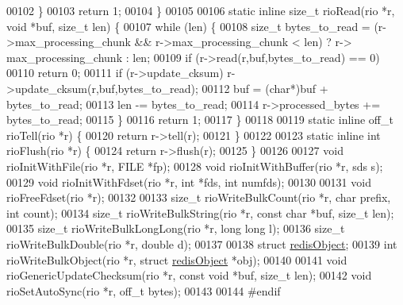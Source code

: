 \begin{DoxyCode}
00102     \}
00103     \textcolor{keywordflow}{return} 1;
00104 \}
00105 
00106 \textcolor{keyword}{static} \textcolor{keyword}{inline} size\_t rioRead(rio *r, \textcolor{keywordtype}{void} *buf, size\_t len) \{
00107     \textcolor{keywordflow}{while} (len) \{
00108         size\_t bytes\_to\_read = (r->max\_processing\_chunk && r->max\_processing\_chunk < len) ? r->
      max\_processing\_chunk : len;
00109         \textcolor{keywordflow}{if} (r->read(r,buf,bytes\_to\_read) == 0)
00110             \textcolor{keywordflow}{return} 0;
00111         \textcolor{keywordflow}{if} (r->update\_cksum) r->update\_cksum(r,buf,bytes\_to\_read);
00112         buf = (\textcolor{keywordtype}{char}*)buf + bytes\_to\_read;
00113         len -= bytes\_to\_read;
00114         r->processed\_bytes += bytes\_to\_read;
00115     \}
00116     \textcolor{keywordflow}{return} 1;
00117 \}
00118 
00119 \textcolor{keyword}{static} \textcolor{keyword}{inline} off\_t rioTell(rio *r) \{
00120     \textcolor{keywordflow}{return} r->tell(r);
00121 \}
00122 
00123 \textcolor{keyword}{static} \textcolor{keyword}{inline} \textcolor{keywordtype}{int} rioFlush(rio *r) \{
00124     \textcolor{keywordflow}{return} r->flush(r);
00125 \}
00126 
00127 \textcolor{keywordtype}{void} rioInitWithFile(rio *r, FILE *fp);
00128 \textcolor{keywordtype}{void} rioInitWithBuffer(rio *r, sds s);
00129 \textcolor{keywordtype}{void} rioInitWithFdset(rio *r, \textcolor{keywordtype}{int} *fds, \textcolor{keywordtype}{int} numfds);
00130 
00131 \textcolor{keywordtype}{void} rioFreeFdset(rio *r);
00132 
00133 size\_t rioWriteBulkCount(rio *r, \textcolor{keywordtype}{char} prefix, \textcolor{keywordtype}{int} count);
00134 size\_t rioWriteBulkString(rio *r, \textcolor{keyword}{const} \textcolor{keywordtype}{char} *buf, size\_t len);
00135 size\_t rioWriteBulkLongLong(rio *r, \textcolor{keywordtype}{long} \textcolor{keywordtype}{long} l);
00136 size\_t rioWriteBulkDouble(rio *r, \textcolor{keywordtype}{double} d);
00137 
00138 \textcolor{keyword}{struct} \hyperlink{structredisObject}{redisObject};
00139 \textcolor{keywordtype}{int} rioWriteBulkObject(rio *r, \textcolor{keyword}{struct} \hyperlink{structredisObject}{redisObject} *obj);
00140 
00141 \textcolor{keywordtype}{void} rioGenericUpdateChecksum(rio *r, \textcolor{keyword}{const} \textcolor{keywordtype}{void} *buf, size\_t len);
00142 \textcolor{keywordtype}{void} rioSetAutoSync(rio *r, off\_t bytes);
00143 
00144 \textcolor{preprocessor}{#}\textcolor{preprocessor}{endif}
\end{DoxyCode}
